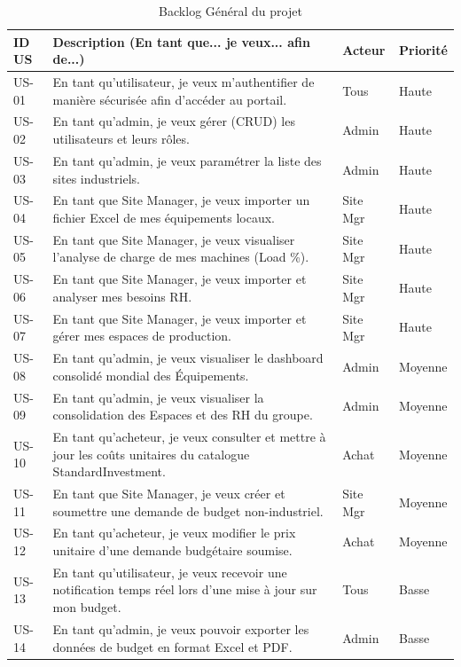 \begin{table}[h]
\centering
\begin{tabular}{|p{2cm}|p{8cm}|p{2cm}|p{2cm}|}
\hline
\textbf{ID US} & \textbf{Description (En tant que... je veux... afin de...)} & \textbf{Acteur} & \textbf{Priorité} \\ \hline
US-01 & En tant qu'utilisateur, je veux m'authentifier de manière sécurisée afin d'accéder au portail. & Tous & Haute \\ \hline
US-02 & En tant qu'admin, je veux gérer (CRUD) les utilisateurs et leurs rôles. & Admin & Haute \\ \hline
US-03 & En tant qu'admin, je veux paramétrer la liste des sites industriels. & Admin & Haute \\ \hline
US-04 & En tant que Site Manager, je veux importer un fichier Excel de mes équipements locaux. & Site Mgr & Haute \\ \hline
US-05 & En tant que Site Manager, je veux visualiser l'analyse de charge de mes machines (Load \%). & Site Mgr & Haute \\ \hline
US-06 & En tant que Site Manager, je veux importer et analyser mes besoins RH. & Site Mgr & Haute \\ \hline
US-07 & En tant que Site Manager, je veux importer et gérer mes espaces de production. & Site Mgr & Haute \\ \hline
US-08 & En tant qu'admin, je veux visualiser le dashboard consolidé mondial des Équipements. & Admin & Moyenne \\ \hline
US-09 & En tant qu'admin, je veux visualiser la consolidation des Espaces et des RH du groupe. & Admin & Moyenne \\ \hline
US-10 & En tant qu'acheteur, je veux consulter et mettre à jour les coûts unitaires du catalogue StandardInvestment. & Achat & Moyenne \\ \hline
US-11 & En tant que Site Manager, je veux créer et soumettre une demande de budget non-industriel. & Site Mgr & Moyenne \\ \hline
US-12 & En tant qu'acheteur, je veux modifier le prix unitaire d'une demande budgétaire soumise. & Achat & Moyenne \\ \hline
US-13 & En tant qu'utilisateur, je veux recevoir une notification temps réel lors d'une mise à jour sur mon budget. & Tous & Basse \\ \hline
US-14 & En tant qu'admin, je veux pouvoir exporter les données de budget en format Excel et PDF. & Admin & Basse \\ \hline
\end{tabular}
\caption{Backlog Général du projet}
\label{tab:backlog}
\end{table}

